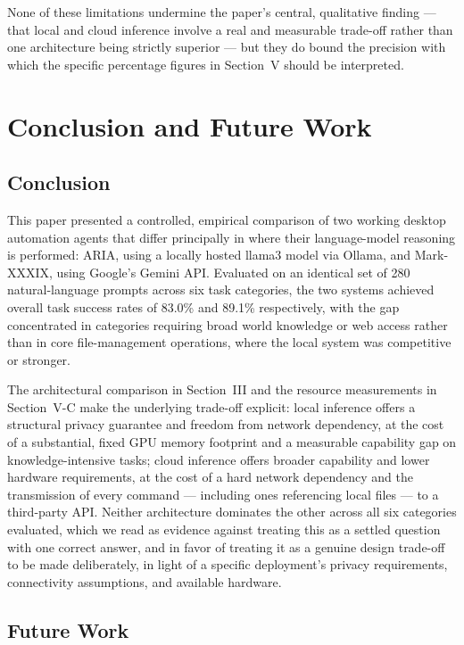 \documentclass[conference]{IEEEtran}
\begin{document}
None of these limitations undermine the paper's central, qualitative finding --- that local and cloud inference involve a real and measurable trade-off rather than one architecture being strictly superior --- but they do bound the precision with which the specific percentage figures in Section~V should be interpreted.

\section{Conclusion and Future Work}

\subsection{Conclusion}

This paper presented a controlled, empirical comparison of two working desktop automation agents that differ principally in where their language-model reasoning is performed: ARIA, using a locally hosted llama3 model via Ollama, and Mark-XXXIX, using Google's Gemini API. Evaluated on an identical set of 280 natural-language prompts across six task categories, the two systems achieved overall task success rates of 83.0\% and 89.1\% respectively, with the gap concentrated in categories requiring broad world knowledge or web access rather than in core file-management operations, where the local system was competitive or stronger.

The architectural comparison in Section~III and the resource measurements in Section~V-C make the underlying trade-off explicit: local inference offers a structural privacy guarantee and freedom from network dependency, at the cost of a substantial, fixed GPU memory footprint and a measurable capability gap on knowledge-intensive tasks; cloud inference offers broader capability and lower hardware requirements, at the cost of a hard network dependency and the transmission of every command --- including ones referencing local files --- to a third-party API. Neither architecture dominates the other across all six categories evaluated, which we read as evidence against treating this as a settled question with one correct answer, and in favor of treating it as a genuine design trade-off to be made deliberately, in light of a specific deployment's privacy requirements, connectivity assumptions, and available hardware.

\subsection{Future Work}
\end{document}
